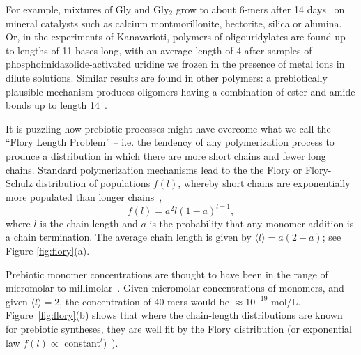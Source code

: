 \documentclass[5p,times]{elsarticle}
\begin{document}
For example, mixtures of Gly and Gly$_2$ grow to about 6-mers after 14 
days~\cite{Rode1997,Rode1999} on mineral catalysts such as calcium montmorillonite, hectorite, 
silica or alumina.  Or, in the 
experiments of Kanavarioti, polymers of oligouridylates are found up to lengths of 11 bases long, 
with an average length of 4 \cite{Kanavarioti2001} after samples of phosphoimidazolide-activated 
uridine we frozen in the presence of metal ions in dilute solutions.  Similar results are found in 
other polymers: a prebiotically plausible mechanism produces oligomers having a combination of 
ester and amide bonds up to length 14~\cite{Forsythe2015}.  

It is puzzling how prebiotic processes might have overcome what we call the ``Flory Length 
Problem'' -- i.e. the tendency of any 
polymerization process to produce a distribution in which there are more short chains and fewer 
long chains.  Standard polymerization mechanisms lead to the the Flory or Flory-Schulz distribution 
of populations $f(l)$, whereby short chains are exponentially more populated than longer 
chains~\cite{Flory1953}, 
\begin{equation}
 f(l)=a^2l(1-a)^{l-1},\label{eq:flory}
\end{equation} 
where $l$ is the chain length and $a$ is the probability that any monomer addition is a chain 
termination.  The average chain length is given by $\langle l \rangle = a(2- a)$; see Figure 
\ref{fig:flory}(a).  

 Prebiotic monomer concentrations are thought to have been in the range of micromolar to 
millimolar~\cite{Stribling1987,Huber1998,Aubrey2009,Kanavarioti2001,Lazcano1996}.  Given micromolar 
concentrations of monomers, and given $\langle l \rangle = 2$, the concentration of 40-mers would 
be $\approx 10^{-19} $ mol/L.  Figure~\ref{fig:flory}(b) shows that where the chain-length 
distributions are known for prebiotic syntheses, they are well fit by the Flory 
distribution (or exponential law $f(l)\propto$ 
constant$^l$)~\cite{nowak2008prevolutionary,Derr2012}).
\end{document}
